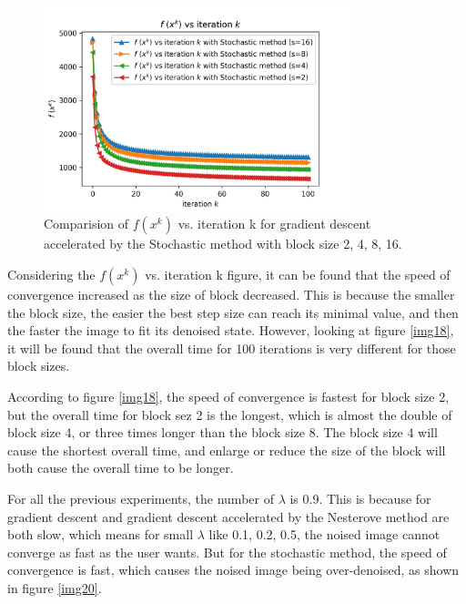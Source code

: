 \documentclass{article}
\begin{document}
\begin{figure}[h]
  \includegraphics[width=3.5in]{pic19.png}
  \centering
  \caption{Comparision of $f(x^{k})$ vs. iteration k for gradient descent accelerated by the Stochastic method with block size 2, 4, 8, 16.}
  \label{img19}
\end{figure}

Considering the  $f(x^{k})$ vs. iteration k figure, it can be found that the speed of convergence increased as the size of block decreased. This is because the smaller the block size, the easier the best step size can reach its minimal value, and then the faster the image to fit its denoised state. However, looking at figure  \ref{img18}, it will be found that the overall time for 100 iterations is very different for those block sizes. 

According to figure \ref{img18}, the speed of convergence is fastest for block size 2, but the overall time for block sez 2 is the longest, which is almost the double of block size 4, or three times longer than the block size 8. The block size 4 will cause the shortest overall time, and enlarge or reduce the size of the block will both cause the overall time to be longer.

For all the previous experiments, the number of $\lambda$ is 0.9. This is because for gradient descent and gradient descent accelerated by the Nesterove method are both slow, which means for small $\lambda$ like 0.1, 0.2, 0.5, the noised image cannot converge as fast as the user wants. But for the stochastic method, the speed of convergence is fast, which causes the noised image being over-denoised, as shown in figure \ref{img20}.
\end{document}
